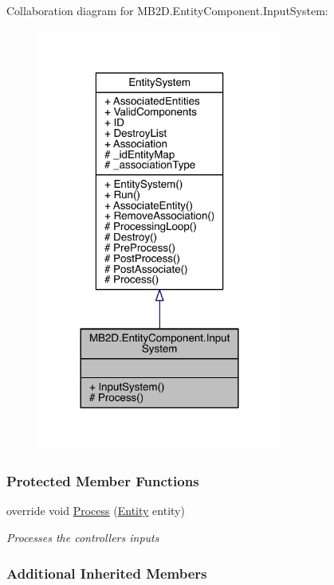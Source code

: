 Collaboration diagram for M\+B2\+D.\+Entity\+Component.\+Input\+System\+:
\nopagebreak
\begin{figure}[H]
\begin{center}
\leavevmode
\includegraphics[width=228pt]{class_m_b2_d_1_1_entity_component_1_1_input_system__coll__graph}
\end{center}
\end{figure}
\subsubsection*{Protected Member Functions}
\begin{DoxyCompactItemize}
\item 
override void \hyperlink{class_m_b2_d_1_1_entity_component_1_1_input_system_afa241f5c32788fc65587e0443f7217b3}{Process} (\hyperlink{class_m_b2_d_1_1_entity_component_1_1_entity}{Entity} entity)
\begin{DoxyCompactList}\small\item\em Processes the controllers inputs \end{DoxyCompactList}\end{DoxyCompactItemize}
\subsubsection*{Additional Inherited Members}



